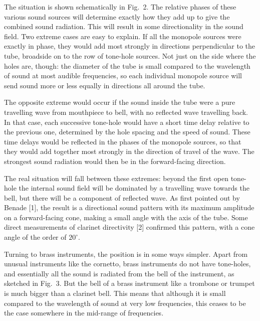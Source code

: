   The situation is shown schematically in Fig.\ 2. The relative phases of these 
  various sound sources will determine exactly how they add up to give the 
  combined sound radiation. This will result in some directionality in the 
  sound field. Two extreme cases are easy to explain. If all the monopole 
  sources were exactly in phase, they would add most strongly in directions 
  perpendicular to the tube, broadside on to the row of tone-hole sources. Not 
  just on the side where the holes are, though: the diameter of the tube is 
  small compared to the wavelength of sound at most audible frequencies, so 
  each individual monopole source will send sound more or less equally in 
  directions all around the tube. 


  The opposite extreme would occur if the sound inside the tube were a pure 
  travelling wave from mouthpiece to bell, with no reflected wave travelling 
  back. In that case, each successive tone-hole would have a short time delay 
  relative to the previous one, determined by the hole spacing and the speed of 
  sound. These time delays would be reflected in the phases of the monopole 
  sources, so that they would add together most strongly in the direction of 
  travel of the wave. The strongest sound radiation would then be in the 
  forward-facing direction. 

  The real situation will fall between these extremes: beyond the first open 
  tone-hole the internal sound field will be dominated by a travelling wave 
  towards the bell, but there will be a component of reflected wave. As first 
  pointed out by Benade [1], the result is a directional sound pattern with its 
  maximum amplitude on a forward-facing cone, making a small angle with the 
  axis of the tube. Some direct measurements of clarinet directivity [2] 
  confirmed this pattern, with a cone angle of the order of $20^\circ$. 

  Turning to brass instruments, the position is in some ways simpler. Apart 
  from unusual instruments like the cornetto, brass instruments do not have 
  tone-holes, and essentially all the sound is radiated from the bell of the 
  instrument, as sketched in Fig.\ 3. But the bell of a brass instrument like a 
  trombone or trumpet is much bigger than a clarinet bell. This means that 
  although it is small compared to the wavelength of sound at very low 
  frequencies, this ceases to be the case somewhere in the mid-range of 
  frequencies. 


